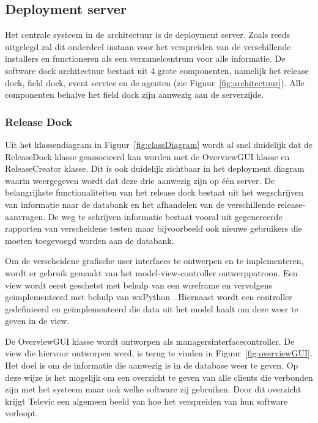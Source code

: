 \subsection{Deployment server}
Het centrale systeem in de architectuur is de deployment server.
Zoals reeds uitgelegd zal dit onderdeel instaan voor het verspreiden van de verschillende installers en functioneren als een verzamelcentrum voor alle informatie.
De software dock architectuur bestaat uit 4 grote componenten, namelijk het release dock, field dock, event service en de agenten (zie Figuur~\ref{fig:architectuur}).
Alle componenten behalve het field dock zijn aanwezig aan de serverzijde.

\subsubsection{Release Dock}
Uit het klassendiagram in Figuur~\ref{fig:classDiagram} wordt al snel duidelijk dat de ReleaseDock klasse geassocieerd kan worden met de OverviewGUI klasse en ReleaseCreator klasse.
Dit is ook duidelijk zichtbaar in het deployment diagram waarin weergegeven wordt dat deze drie aanwezig zijn op één server.
De belangrijkste functionaliteiten van het release dock bestaat uit het wegschrijven van informatie naar de databank en het afhandelen van de verschillende release-aanvragen.
De weg te schrijven informatie bestaat vooral uit gegenereerde rapporten van verscheidene testen maar bijvoorbeeld ook nieuwe gebruikers die moeten toegevoegd worden aan de databank.

Om de verscheidene grafische user interfaces te ontwerpen en te implementeren, wordt er gebruik gemaakt van het model-view-controller ontwerppatroon.
Een view wordt eerst geschetst met behulp van een wireframe en vervolgens geïmplementeerd met behulp van wxPython \citep{wxPython}.
Hiernaast wordt een controller gedefinieerd en geïmplementeerd die data uit het model haalt om deze weer te geven in de view.

De OverviewGUI klasse wordt ontworpen als managersinterfacecontroller.
De view die hiervoor ontworpen werd, is terug te vinden in Figuur~\vref{fig:overviewGUI}.
Het doel is om de informatie die aanwezig is in de database weer te geven.
Op deze wijze is het mogelijk om een overzicht te geven van alle clients die verbonden zijn met het systeem maar ook welke software zij gebruiken.
Door dit overzicht krijgt Televic een algemeen beeld van hoe het verspreiden van hun software verloopt.


